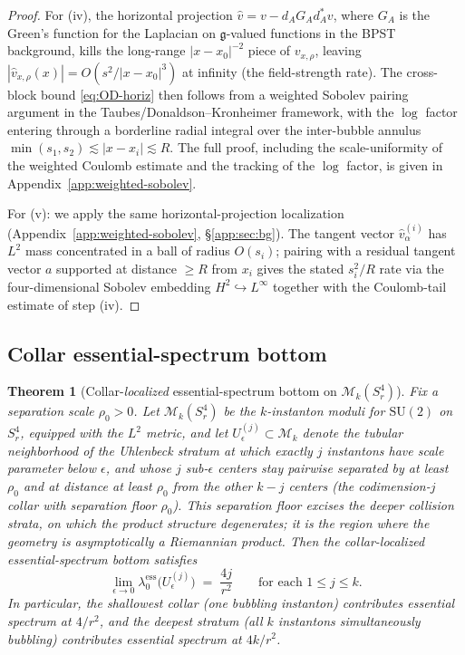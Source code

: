 \documentclass[11pt,letterpaper]{article}
\newtheorem{theorem}{Theorem}[section]
\theoremstyle{definition}
\newcommand{\cM}{\mathcal{M}}
\newcommand{\fg}{\mathfrak{g}}
\begin{document}
\begin{proof}
For (iv), the horizontal projection $\hat{v} = v - d_{A} G_A d_A^* v$, where $G_A$ is the Green's function for the Laplacian on $\fg$-valued functions in the BPST background, kills the long-range $|x-x_0|^{-2}$ piece of $v_{x,\rho}$, leaving $|\hat{v}_{x,\rho}(x)| = O(s^2/|x-x_0|^3)$ at infinity (the field-strength rate). The cross-block bound \eqref{eq:OD-horiz} then follows from a weighted Sobolev pairing argument in the Taubes/Donaldson--Kronheimer framework, with the $\log$ factor entering through a borderline radial integral over the inter-bubble annulus $\min(s_1,s_2) \lesssim |x-x_i| \lesssim R$. The full proof, including the scale-uniformity of the weighted Coulomb estimate and the tracking of the $\log$ factor, is given in Appendix~\ref{app:weighted-sobolev}.

For (v): we apply the same horizontal-projection localization (Appendix~\ref{app:weighted-sobolev}, \S\ref{app:sec:bg}). The tangent vector $\hat{v}_\alpha^{(i)}$ has $L^2$ mass concentrated in a ball of radius $O(s_i)$; pairing with a residual tangent vector $a$ supported at distance $\ge R$ from $x_i$ gives the stated $s_i^2/R$ rate via the four-dimensional Sobolev embedding $H^2 \hookrightarrow L^\infty$ together with the Coulomb-tail estimate of step (iv).
\end{proof}

\subsection{Collar essential-spectrum bottom}

\begin{theorem}[Collar-\emph{localized} essential-spectrum bottom on $\cM_k(S^4_r)$]\label{thm:M_k-collar-conditional}
Fix a separation scale $\rho_0 > 0$. Let $\cM_k(S^4_r)$ be the $k$-instanton moduli for $\mathrm{SU}(2)$ on $S^4_r$, equipped with the $L^2$ metric, and let $U_\epsilon^{(j)} \subset \cM_k$ denote the tubular neighborhood of the Uhlenbeck stratum at which exactly $j$ instantons have scale parameter below $\epsilon$, and whose $j$ sub-$\epsilon$ centers stay pairwise separated by at least $\rho_0$ and at distance at least $\rho_0$ from the other $k-j$ centers (the codimension-$j$ collar with separation floor $\rho_0$). This separation floor excises the deeper collision strata, on which the product structure degenerates; it is the region where the geometry is asymptotically a Riemannian product. Then the collar-\emph{localized} essential-spectrum bottom satisfies
\[
\lim_{\epsilon \to 0}\lambda_0^{\mathrm{ess}}\bigl(U_\epsilon^{(j)}\bigr) \;=\; \frac{4j}{r^2}\qquad\text{for each } 1 \le j \le k.
\]
In particular, the shallowest collar (one bubbling instanton) contributes essential spectrum at $4/r^2$, and the deepest stratum (all $k$ instantons simultaneously bubbling) contributes essential spectrum at $4k/r^2$.
\end{theorem}
\end{document}
